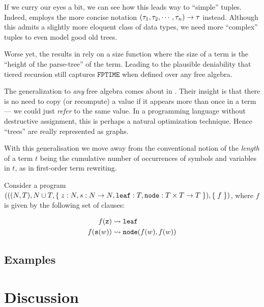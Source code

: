 If we curry our eyes a bit, we can see how this leads way to ``simple'' tuples.
Indeed, \cite{marion-2003} employs the more concise notation
${\mathopen{}\left({\tau_1,\tau_2,\cdots,\tau_n}\right)\mathclose{}}\rightarrow \tau$ instead.  Although this
admits a slightly more eloquent class of data types, we need more ``complex''
tuples to even model good old trees.

Worse yet, the results in \cite{leivant-1995} rely on a size function where the
size of a term is the ``height of the parse-tree'' of the term. Leading to the
plausible deniability that tiered recursion still captures $\mathtt{FPTIME}$
when defined over any free algebra\cite{caseiro-1996}.

The generalization to \emph{any} free algebra comes about in
\cite{dal-lago-et-al-2010}. Their insight is that there is no need to copy (or
recompute) a value if it appears more than once in a term --- we could just
\emph{refer} to the same value. In a programming language without destructive
assignment, this is perhaps a natural optimization technique. Hence ``trees''
are really represented as graphs.

\begin{remark} With this generalisation we move away from the conventional
notion of the \emph{length} of a term $t$ being the cumulative number of
occurrences of symbols and variables in $t$, as in first-order term
rewriting\cite{klop-vrijer-2003}. \end{remark}

\begin{example} \cite{dal-lago-et-al-2003} Consider a program ${\mathopen{}\left({{\mathopen{}\left({{\mathopen{}\left({N,T}\right)\mathclose{}}, N
\cup T, \mathopen{}\left\{\mathrel{}{z : N, s : N \rightarrow N, \mathtt{leaf} : T, \mathtt{node} : T
\times T \rightarrow T}\mathrel{}\right\}\mathclose{}}\right)\mathclose{}}, \mathopen{}\left\{\mathrel{}{f}\mathrel{}\right\}\mathclose{}}\right)\mathclose{}}$, where $f$ is given by the following set of
clauses:

\begin{align}
f{\mathopen{}\left({\mathtt{z}}\right)\mathclose{}}       &\leadsto \mathtt{leaf} \\
f{\mathopen{}\left({\mathtt{s}{\mathopen{}\left({w}\right)\mathclose{}}}\right)\mathclose{}}  &\leadsto \mathtt{node}{\mathopen{}\left({f{\mathopen{}\left({w}\right)\mathclose{}}, f{\mathopen{}\left({w}\right)\mathclose{}}}\right)\mathclose{}}
\end{align}

\end{example}

\subsection{Examples}

\section{Discussion}
